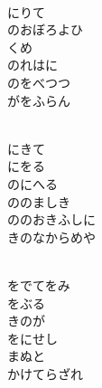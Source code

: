 \documentclass[10pt,b5j]{tarticle} %
\begin{document}
\vspace{1.5em} %
\newcommand{\linespace}{0.5em} %
\newcommand{\blocksize}{0.5\hsize} %
\newcommand{\itemmargin}{3em} %
\begin{enumerate} %
    \setlength{\itemindent}{\itemmargin} %
    \begin{minipage}[c]{\blocksize}
    
        \vspace{\linespace}
        \item~\\
        にりて\\
        のおぼろよひ\\
        くめ\\
        のれはに\\
        のをべつつ\\
        がをふらん
        
    \end{minipage}
    \begin{minipage}[c]{\blocksize}
        
        \vspace{\linespace}
        \item~\\
        にきて\\
        にをる\\
        のにへる\\
        ののましき\\
        ののおきふしに\\
        きのなからめや
        
    \end{minipage}
    \begin{minipage}[c]{\blocksize}
        
        \vspace{\linespace}
        \item~\\
        をでてをみ\\
        をぶる\\
        きのが\\
        をにせし\\
        まぬと\\
        かけてらざれ
        

\end{minipage}
\end{enumerate}
\end{document}
